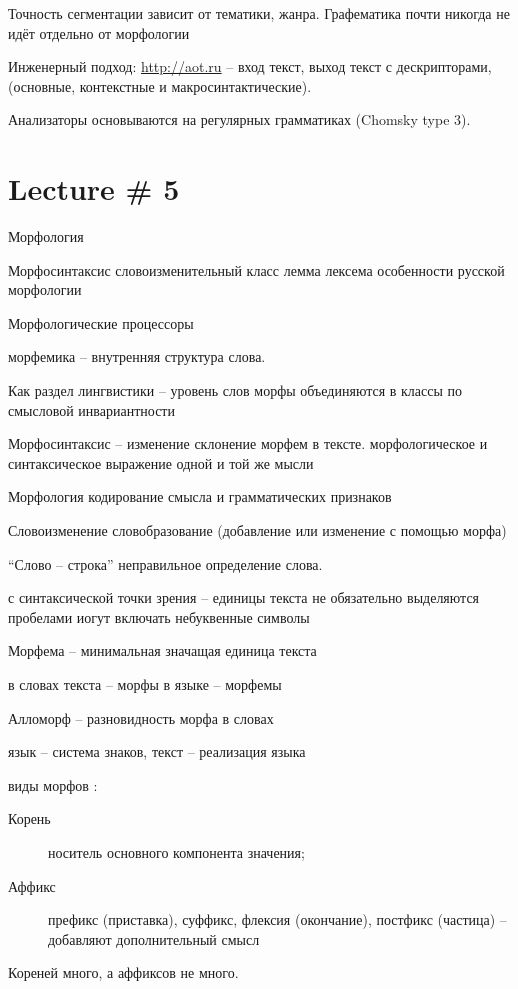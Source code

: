 \documentclass[a4paper]{article}
\newcommand{\eng}[1]{\foreignlanguage{english}{#1}}
\begin{document}
Точность сегментации зависит от тематики, жанра.
Графематика почти никогда не идёт отдельно от морфологии

Инженерный подход: \url{http://aot.ru} -- вход текст, выход текст с дескрипторами, (основные, контекстные и макросинтактические).


Анализаторы основываются на регулярных грамматиках (\eng{Chomsky type 3}).


\section{Lecture \# 5} %
\label{sec:lecture_5}

Морфология

Морфосинтаксис
	словоизменительный класс
	лемма
	лексема
	особенности русской морфологии

Морфологические процессоры

морфемика -- внутренняя структура слова.

Как раздел лингвистики -- уровень слов
морфы объединяются в классы по смысловой инвариантности

Морфосинтаксис -- изменение склонение морфем в тексте.
морфологическое и синтаксическое выражение одной и той же мысли


Морфология кодирование смысла и грамматических признаков

Словоизменение
словобразование (добавление или изменение с помощью морфа)

``Слово -- строка'' неправильное определение слова.

с синтаксической точки зрения -- единицы текста
не обязательно выделяются пробелами
иогут включать небуквенные символы


Морфема -- минимальная значащая единица текста

в словах текста -- морфы
в языке -- морфемы

Алломорф -- разновидность морфа в словах

язык -- система знаков, текст -- реализация языка

виды морфов :
\begin{description}
	\item[Корень] носитель основного компонента значения;
	\item[Аффикс] префикс (приставка), суффикс, флексия (окончание), постфикс (частица) -- добавляют дополнительный смысл
\end{description}
Кореней много, а аффиксов не много.
\end{document}
